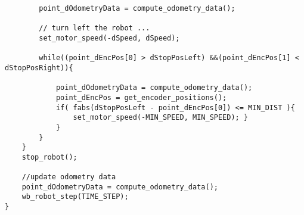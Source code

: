 \begin{lstlisting}
		point_dOdometryData = compute_odometry_data();

		// turn left the robot ...
		set_motor_speed(-dSpeed, dSpeed);

		while((point_dEncPos[0] > dStopPosLeft) &&(point_dEncPos[1] < dStopPosRight)){

			point_dOdometryData = compute_odometry_data();
			point_dEncPos = get_encoder_positions();
			if( fabs(dStopPosLeft - point_dEncPos[0]) <= MIN_DIST ){
				set_motor_speed(-MIN_SPEED, MIN_SPEED); }
			}
		}
	}
	stop_robot();
	
	//update odometry data
	point_dOdometryData = compute_odometry_data();
	wb_robot_step(TIME_STEP);
}
\end{lstlisting}



